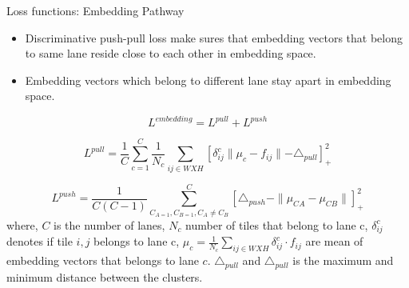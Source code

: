 \documentclass[aspectratio=169]{beamer}
\begin{document}
\begin{frame}{Loss functions: Embedding Pathway}
\begin{itemize}
    \item Discriminative push-pull loss make sures that embedding vectors that belong to same lane reside close to each other in embedding space.
    \item Embedding vectors which belong to different lane stay apart in embedding space. 
\end{itemize}
 \begin{equation}
                L^{embedding} = L^{pull} + L^{push}
            \end{equation}
             
             \begin{equation}
                     L^{pull} = \frac{1}{C} \sum^{C}_{c=1}\frac{1}{N_{c}} \sum_{ij \in WXH}[ \delta_{ij}^{c} \parallel \mu_{c} - f_{ij}  \parallel - \triangle_{pull} ]_{+}^{2} 
             \end{equation}
             
             \begin{equation}
                 L^{push} =  \frac{1}{C(C -1)} \sum^{C}_{C_{A=1}, C_{B=1}, C_{A} \not =C_{B}}[ \triangle_{push} - \parallel \mu_{CA} - \mu_{CB}\parallel ]_{+}^{2}
             \end{equation}
    \tiny
    where, $C$ is the number of lanes, $N_{c}$ number of tiles that belong to lane c, $\delta_{ij}^{c}$ denotes if tile $i,j$ belongs to lane c, $\mu_{c} = \frac{1}{N_{c}} \sum_{ij \in WXH } \delta^{c}_{ij} \cdot f_{ij}$ are mean of embedding vectors that belongs to lane $c$. $\triangle_{pull}$ and $\triangle_{pull}$ is the maximum and minimum distance between the clusters.
\end{frame}
\end{document}
